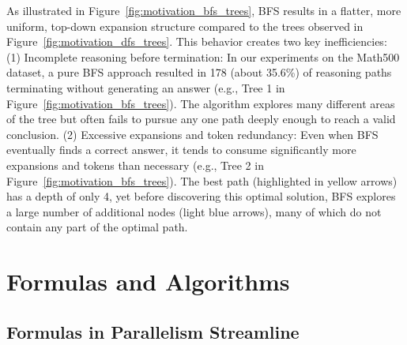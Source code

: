 
As illustrated in Figure~\ref{fig:motivation_bfs_trees}, BFS results in a flatter, more uniform, top-down expansion structure compared to the trees observed in Figure~\ref{fig:motivation_dfs_trees}. This behavior creates two key inefficiencies: 
(1) Incomplete reasoning before termination: In our experiments on the Math500 dataset, a pure BFS approach resulted in 178 (about 35.6\%)  of reasoning paths terminating without generating an answer (e.g., Tree 1 in Figure~\ref{fig:motivation_bfs_trees}). The algorithm explores many different areas of the tree but often fails to pursue any one path deeply enough to reach a valid conclusion. 
(2) Excessive expansions and token redundancy: Even when BFS eventually finds a correct answer, it tends to consume significantly more expansions and tokens than necessary (e.g., Tree 2 in Figure~\ref{fig:motivation_bfs_trees}). The best path (highlighted in yellow arrows) has a depth of only 4, yet before discovering this optimal solution, BFS explores a large number of additional nodes (light blue arrows), many of which do not contain any part of the optimal path.

\section{Formulas and Algorithms}
\label{sec:app:formulas_and_algorithms}

\subsection{Formulas in Parallelism Streamline}
\label{app:sec:parallel_reasoning}


